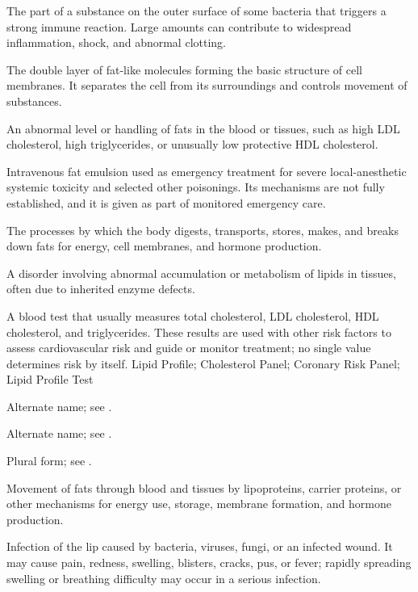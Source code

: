  The part of a substance on the outer surface of some bacteria that triggers a strong immune reaction. Large amounts can contribute to widespread inflammation, shock, and abnormal clotting.

 The double layer of fat-like molecules forming the basic structure of cell membranes. It separates the cell from its surroundings and controls movement of substances.

 An abnormal level or handling of fats in the blood or tissues, such as high LDL cholesterol, high triglycerides, or unusually low protective HDL cholesterol.

 Intravenous fat emulsion used as emergency treatment for severe local-anesthetic systemic toxicity and selected other poisonings. Its mechanisms are not fully established, and it is given as part of monitored emergency care.

 The processes by which the body digests, transports, stores, makes, and breaks down fats for energy, cell membranes, and hormone production.

 A disorder involving abnormal accumulation or metabolism of lipids in tissues, often due to inherited enzyme defects.

 A blood test that usually measures total cholesterol, LDL cholesterol, HDL cholesterol, and triglycerides. These results are used with other risk factors to assess cardiovascular risk and guide or monitor treatment; no single value determines risk by itself.
\synonyms
Lipid Profile; Cholesterol Panel; Coronary Risk Panel; Lipid Profile Test

 Alternate name; see .

 Alternate name; see .

 Plural form; see .

 Movement of fats through blood and tissues by lipoproteins, carrier proteins, or other mechanisms for energy use, storage, membrane formation, and hormone production.

 Infection of the lip caused by bacteria, viruses, fungi, or an infected wound. It may cause pain, redness, swelling, blisters, cracks, pus, or fever; rapidly spreading swelling or breathing difficulty may occur in a serious infection.

